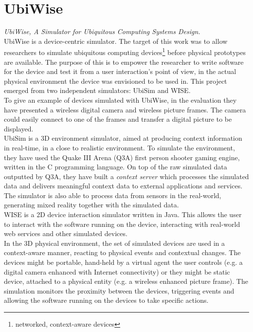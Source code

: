 \section{UbiWise}\label{sec:ubiwise}
\emph{UbiWise, A Simulator for Ubiquitous Computing Systems Design.}\\

UbiWise \cite{barton2003ubiwise} is a device-centric simulator. The target of this work was to allow researchers to simulate ubiquitous computing devices\footnote{networked, context-aware devices} before physical prototypes are available. The purpose of this is to empower the researcher to write software for the device and test it from a user interaction's point of view, in the actual physical environment the device was envisioned to be used in. This project emerged from two independent simulators: UbiSim and WISE.\\

To give an example of devices simulated with UbiWise, in the evaluation they have presented a wireless digital camera and wireless picture frames. The camera could easily connect to one of the frames and transfer a digital picture to be displayed.\\

UbiSim is a 3D environment simulator, aimed at producing context information in real-time, in a close to realistic environment. To simulate the environment, they have used the Quake III Arena (Q3A) \cite{q3a:online} first person shooter gaming engine, written in the C programming language. On top of the raw simulated data outputted by Q3A, they have built a \emph{context server} which processes the simulated data and delivers meaningful context data to external applications and services. The simulator is also able to process data from sensors in the real-world, generating mixed reality together with the simulated data.\\

WISE is a 2D device interaction simulator written in Java. This allows the user to interact with the software running on the device, interacting with real-world web services and other simulated devices.\\

In the 3D physical environment, the set of simulated devices are used in a context-aware manner, reacting to physical events and contextual changes. The devices might be portable, hand-held by a virtual agent the user controls (e.g. a digital camera enhanced with Internet connectivity) or they might be static device, attached to a physical entity (e.g. a wireless enhanced picture frame). The simulation monitors the proximity between the devices, triggering events and allowing the software running on the devices to take specific actions.\\

